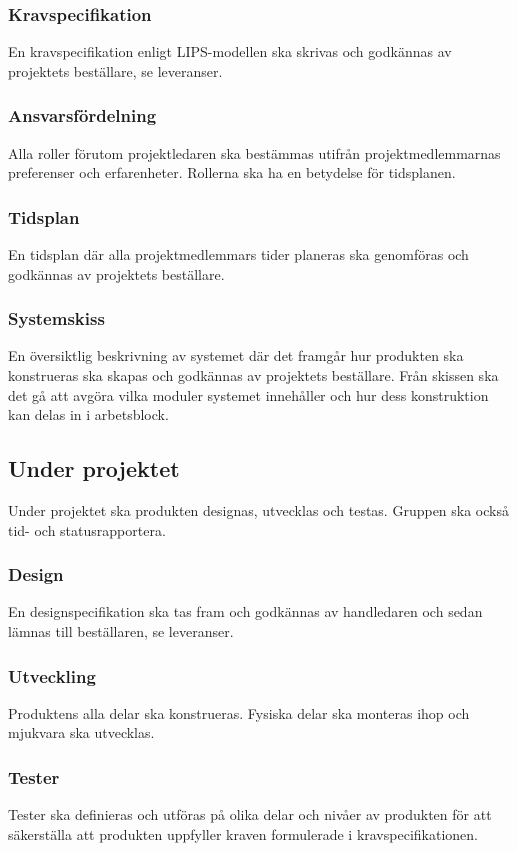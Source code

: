 \documentclass{article}
\begin{document}
\subsubsection{Kravspecifikation}
En kravspecifikation enligt LIPS-modellen ska skrivas och godkännas av projektets beställare, se leveranser.

\subsubsection{Ansvarsfördelning}
Alla roller förutom projektledaren ska bestämmas utifrån projektmedlemmarnas preferenser och erfarenheter. Rollerna ska ha en betydelse för tidsplanen.

\subsubsection{Tidsplan}
En tidsplan där alla projektmedlemmars tider planeras ska genomföras och godkännas av projektets beställare.

\subsubsection{Systemskiss}
En översiktlig beskrivning av systemet där det framgår hur produkten ska konstrueras ska skapas och godkännas av projektets beställare. Från skissen ska det gå att avgöra vilka moduler systemet innehåller och hur dess konstruktion kan delas in i arbetsblock.

\subsection{Under projektet}
Under projektet ska produkten designas, utvecklas och testas. Gruppen ska också tid- och statusrapportera.

\subsubsection{Design}
En designspecifikation ska tas fram och godkännas av handledaren och sedan lämnas till beställaren, se leveranser. 

\subsubsection{Utveckling}
Produktens alla delar ska konstrueras. Fysiska delar ska monteras ihop och mjukvara ska utvecklas.

\subsubsection{Tester}
Tester ska definieras och utföras på olika delar och nivåer av produkten för att säkerställa att produkten uppfyller kraven formulerade i kravspecifikationen.
\end{document}
